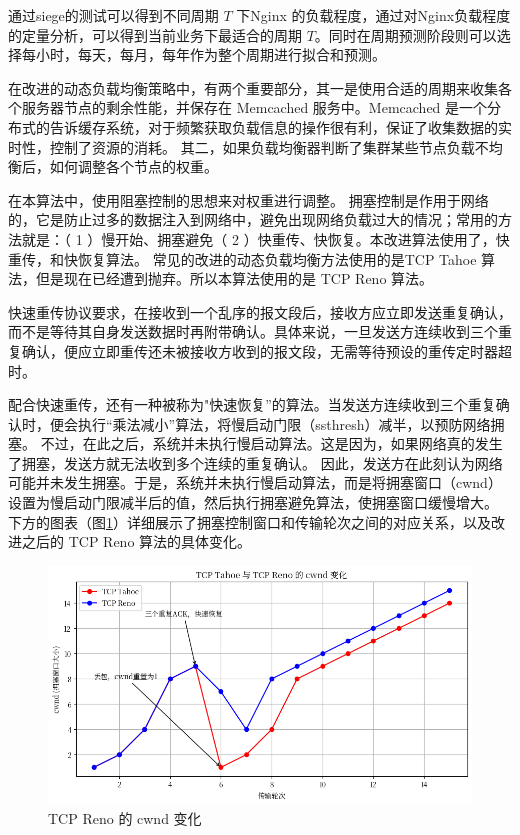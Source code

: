 通过siege的测试可以得到不同周期 $T$ 下Nginx 的负载程度，通过对Nginx负载程度的定量分析，可以得到当前业务下最适合的周期 $T$。同时在周期预测阶段则可以选择每小时，每天，每月，每年作为整个周期进行拟合和预测。

在改进的动态负载均衡策略中，有两个重要部分，其一是使用合适的周期来收集各个服务器节点的剩余性能，并保存在 Memcached 服务中。Memcached 是一个分布式的告诉缓存系统，对于频繁获取负载信息的操作很有利，保证了收集数据的实时性，控制了资源的消耗。
其二，如果负载均衡器判断了集群某些节点负载不均衡后，如何调整各个节点的权重。

在本算法中，使用阻塞控制的思想来对权重进行调整。
拥塞控制是作用于网络的，它是防止过多的数据注入到网络中，避免出现网络负载过大的情况；常用的方法就是：（ 1 ）慢开始、拥塞避免（ 2 ）快重传、快恢复。本改进算法使用了，快重传，和快恢复算法。
常见的改进的动态负载均衡方法使用的是TCP Tahoe 算法，但是现在已经遭到抛弃。所以本算法使用的是 TCP Reno 算法。

快速重传协议要求，在接收到一个乱序的报文段后，接收方应立即发送重复确认，而不是等待其自身发送数据时再附带确认。具体来说，一旦发送方连续收到三个重复确认，便应立即重传还未被接收方收到的报文段，无需等待预设的重传定时器超时。

配合快速重传，还有一种被称为"快速恢复”的算法。当发送方连续收到三个重复确认时，便会执行“乘法减小”算法，将慢启动门限（ssthresh）减半，以预防网络拥塞。
不过，在此之后，系统并未执行慢启动算法。这是因为，如果网络真的发生了拥塞，发送方就无法收到多个连续的重复确认。
因此，发送方在此刻认为网络可能并未发生拥塞。于是，系统并未执行慢启动算法，而是将拥塞窗口（cwnd）设置为慢启动门限减半后的值，然后执行拥塞避免算法，使拥塞窗口缓慢增大。
下方的图表（图\ref{tcp_reno}）详细展示了拥塞控制窗口和传输轮次之间的对应关系，以及改进之后的 TCP Reno 算法的具体变化。

\begin{figure}[htbp]
  \centering
  \includegraphics[width=\textwidth]{figures/tcp_reno.png}
  \caption{TCP Reno 的 cwnd 变化}
  \label{tcp_reno}
\end{figure}

